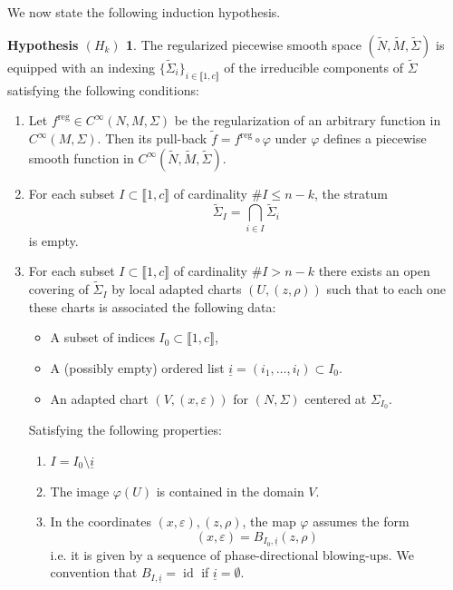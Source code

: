 \documentclass[11pt,psamsfonts]{article}
\newcommand{\tmop}[1]{\ensuremath{\operatorname{#1}}}
\newenvironment{enumeratealpha}{\begin{enumerate}[a{\textup{)}}] }{\end{enumerate}}
\newenvironment{enumeratenumeric}{\begin{enumerate}[1.] }{\end{enumerate}}
\theoremstyle{definition}
\newtheorem*{Hypothesis}{Hypothesis $(H_k)$}
\theoremstyle{remark}
\newcommand{\eps}{\varepsilon }
\newcommand{\reg}{\mathrm{reg}}
\begin{document}
We now state the following induction hypothesis.

\begin{Hypothesis}
  The regularized piecewise smooth space $(\tilde{N}, \tilde{M}, \tilde{\Sigma})$ is equipped with an indexing $\{ \tilde{\Sigma}_i \}_{i \in \llbracket
  1, c \rrbracket}$ of the irreducible components of $\tilde{\Sigma}$ satisfying the following
  conditions:
  \begin{enumeratealpha}
    \item Let $f^\reg \in C^{\infty} (N,M,\Sigma)$ be  the regularization of an arbitrary function in $C^\infty(M,\Sigma)$. Then its pull-back $\tilde{f}
    = f^\reg \circ \varphi$ under $\varphi$ defines a piecewise smooth function in
    $C^{\infty} (\tilde{N}, \tilde{M},\tilde{\Sigma})$. \
    
    \item For each subset $I \subset \llbracket 1, c \rrbracket$ of
    cardinality $\#I \leqslant n - k$, the stratum
    \[ \tilde{\Sigma}_I = \bigcap_{i \in I} \tilde{\Sigma}_i \]
    is empty.
    
    \item For each subset $I \subset \llbracket 1, c \rrbracket$ of
    cardinality $\#I > n - k$ there exists an open covering of
    $\tilde{\Sigma}_I$ by local adapted charts $(U, (z, \rho))$ such that to each one these charts is
    associated the following data:
    \begin{itemize}
      \item A subset of indices $I_0 \subset \llbracket 1, c \rrbracket$,
      
      \item A (possibly empty) ordered list $\underline{i} = (i_1, \ldots,
      i_l) \subset I_0 .$
      
      \item An adapted chart $\left( V, \left( x, \eps \right) \right)$ for
      $(N, \Sigma)$ centered at $\Sigma_{I_0}$.
    \end{itemize}
    Satisfying the following properties:
    \begin{enumeratenumeric}
      \item $I = I_0 \setminus \underline{i}$
      
      \item The image $\varphi (U)$ is contained in the domain $V$.
      
      \item In the coordinates $\left( x, \eps \right), (z, \rho)$, the map
      $\varphi$ assumes the form
      \begin{equation}
        \left( x, \eps \right) = B_{I_0, \underline{i}}  (z, \rho)
        \label{local-expr-blow-up}
      \end{equation}
      i.e. it is given by a sequence of phase-directional blowing-ups. We
      convention that $B_{I, \underline{i}} = \tmop{id}$ if $\underline{i} =
      \emptyset$.
    \end{enumeratenumeric}
  \end{enumeratealpha}
\end{Hypothesis}
\end{document}
